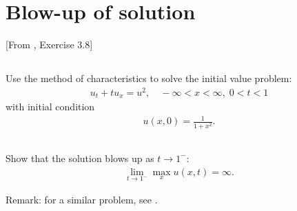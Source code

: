 \documentclass[11pt,letterpaper]{article}
\begin{document}
\section{Blow-up of solution}
[From \cite{ShearerLevy_15}, Exercise 3.8] 

\subsection{}
Use the method of characteristics to solve the initial value problem: 
\begin{align}
    u_t+tu_x = u^2,\quad -\infty<x<\infty,\; 0<t<1
\end{align}
with initial condition 
\begin{align}
    u(x,0) = \frac{1}{1+x^2}.
\end{align}

\subsection{}
Show that the solution blows up as $t\to 1^-$:
\begin{align}
    \lim_{t\to 1^-} \max_x u(x,t) = \infty.
\end{align}

Remark: for a similar problem, see \cite[Exercise 2.2.11]{Olver_14}.

\end{document}
